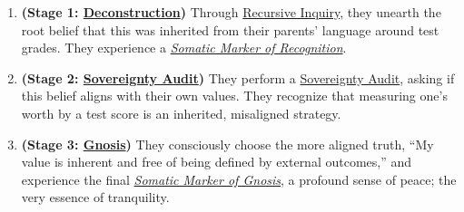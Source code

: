 \documentclass{article}
\begin{document}
\begin{description}
\begin{enumerate}
\begin{enumerate}[leftmargin=*, label=Step \arabic*]
            \item \textbf{(Stage 1: \hyperlink{gloss:deconstruction}{Deconstruction})} Through \hyperlink{gloss:recursive_inquiry}{Recursive Inquiry}, they unearth the root belief that this was inherited from their parents' language around test grades. They experience a \textit{\hyperlink{gloss:somatic_marker_of_recognition}{Somatic Marker of Recognition}}.
            \item \textbf{(Stage 2: \hyperlink{gloss:sovereignty_audit}{Sovereignty Audit})} They perform a \hyperlink{gloss:sovereignty_audit}{Sovereignty Audit}, asking if this belief aligns with their own values. They recognize that measuring one's worth by a test score is an inherited, misaligned strategy.
            \item \textbf{(Stage 3: \hyperlink{gloss:gnosis}{Gnosis})} They consciously choose the more aligned truth, ``My value is inherent and free of being defined by external outcomes,'' and experience the final \textit{\hyperlink{gloss:somatic_marker_of_gnosis}{Somatic Marker of Gnosis}}, a profound sense of peace; the very essence of tranquility.
        \end{enumerate}
        

\end{enumerate}
\end{description}
\end{document}
